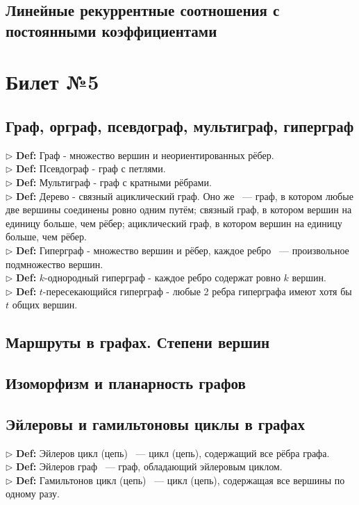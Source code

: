\documentclass[a4paper]{article}
\begin{document}
\subsection{Линейные рекуррентные соотношения с постоянными коэффициентами}

\section{Билет №5}
\subsection{Граф, орграф, псевдограф, мультиграф, гиперграф}
$\triangleright$ \textbf{Def:} Граф - множество вершин и неориентированных рёбер.
\\
$\triangleright$ \textbf{Def:} Псевдограф - граф с петлями.
\\
$\triangleright$ \textbf{Def:} Мультиграф - граф с кратными рёбрами.
\\
$\triangleright$ \textbf{Def:} Дерево - связный ациклический граф. Оно же ~--- граф, в котором любые две вершины соединены ровно одним путём; связный граф, в котором вершин на единицу больше, чем рёбер; ациклический граф,  в котором вершин на единицу больше, чем рёбер.
\\
$\triangleright$ \textbf{Def:} Гиперграф - множество вершин и рёбер,  каждое ребро ~--- произвольное подмножество вершин.
\\
$\triangleright$ \textbf{Def:} $k$-однородный гиперграф - каждое ребро содержат ровно $k$ вершин.
\\
$\triangleright$ \textbf{Def:} $t$-пересекающийся гиперграф - любые 2 ребра гиперграфа имеют хотя бы $t$ общих вершин.
\\

\subsection{Маршруты в графах. Степени вершин}

\subsection{Изоморфизм и планарность графов}
\subsection{Эйлеровы и гамильтоновы циклы в графах}
$\triangleright$ \textbf{Def:} Эйлеров цикл (цепь) ~--- цикл (цепь), содержащий все рёбра графа.
\\
$\triangleright$ \textbf{Def:} Эйлеров граф ~--- граф, обладающий эйлеровым циклом.
\\
$\triangleright$ \textbf{Def:} Гамильтонов цикл (цепь) ~--- цикл (цепь), содержащая все вершины по одному разу.
\\
\end{document}
